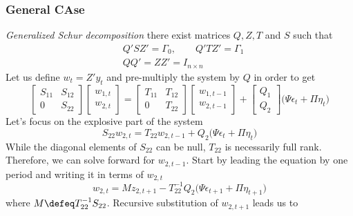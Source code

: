 \documentclass[a4paper,10pt]{article}  %
\begin{document}

\subsubsection{General CAse} %
\label{sub:general_case}
\emph{Generalized Schur decomposition} there exist matrices $ Q,Z,T $ and $ S $
such that
\begin{align}
   & Q' S Z' = \Gamma_0, \qquad Q' T Z' = \Gamma_1 \\
   & QQ' = ZZ' = I_{n\times n}
\end{align}
Let us define $ w_t = Z'y_t $ and pre-multiply the system by $ Q $ in order to get
\begin{equation}
   \label{eq:QZsims_eq01}
   \begin{bmatrix}
      S_{11} & S_{12} \\ 0 & S_{22}
   \end{bmatrix}   
   \begin{bmatrix}
      w_{1,t} \\ w_{2,t}
   \end{bmatrix} = 
   \begin{bmatrix}
      T_{11} & T_{12} \\ 0 & T_{22}
   \end{bmatrix}
   \begin{bmatrix}
      w_{1,t-1} \\ w_{2,t-1}
   \end{bmatrix} +
   \begin{bmatrix}
      Q_1 \\ Q_2
   \end{bmatrix}
   \Big( \Psi \epsilon_t + \Pi \eta_t \Big) 
\end{equation}
Let's focus on the explosive part of the system 
\[
   S_{22} w_{2,t} = T_{22} w_{2,t-1} + Q_2\Big( \Psi \epsilon_t + \Pi \eta_t \Big) 
\]
While the diagonal elements of $ S_{22} $ can be null, $ T_{22} $ is necessarily full rank. Therefore, we can solve
forward for $ w_{2,t-1} $. Start by leading the equation by one period and writing it in terms of $ w_{2,t} $
\[
   w_{2,t} = M z_{2,t+1} - T_{22}^{-1} Q_2 \Big( \Psi \epsilon_{t+1} + \Pi \eta_{t+1} \Big) 
\]
where $ M \defeq T_{22}^{-1} S_{22} $. Recursive substitution of $ w_{2,t+1} $ leads us to 
\end{document}
